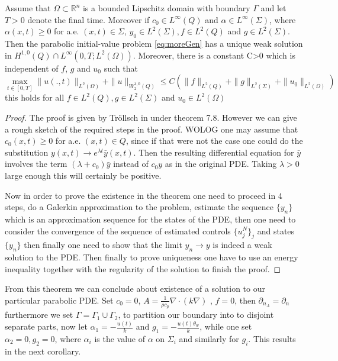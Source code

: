 \begin{theorem} Assume that $\Omega \subset \mathbb{R}^n$ is a bounded Lipschitz domain with boundary $\Gamma$ and let $T>0$ denote the final time. Moreover if $c_0 \in L^{\infty}(Q)$ and $\alpha \in L^{\infty}(\Sigma)$, where $\alpha(x,t) \geq 0$ for a.e. $(x,t) \in \Sigma$, $y_0 \in L^2(\Sigma), f \in L^2(Q)$ and $g \in L^2(\Sigma)$. Then the parabolic initial-value problem \eqref{eq:moreGen} has a unique weak solution in $H^{1,0}(Q)\cap L^{\infty}(0,T;L^2(\Omega))$. Moreover, there is a constant C>0 which is independent of $f$, $g$ and $u_0$ such that 
\begin{equation*}
    \max_{t \in [0,T]}\|u(.,t)\|_{L^2(\Omega)} + \|u\|_{W_2^{1,0}(Q)} \leq C(\|f\|_{L^2(Q)} + \|g\|_{L^2(\Sigma)} + \|u_0\|_{L^2(\Omega)})
\end{equation*}
this holds for all $f \in L^2(Q), g \in L^2(\Sigma)$ and $u_0 \in L^2(\Omega)$
\end{theorem}

\begin{proof}
The proof is given by Tröllsch in \cite{optimalControl} under theorem 7.8. However we can give a rough sketch of the required steps in the proof. WOLOG one may assume that $c_0(x,t)\geq 0$ for a.e. $(x,t) \in Q$, since if that were not the case one could do the substitution $y(x,t) \rightarrow e^{\lambda t}\bar{y}(x,t)$. Then the resulting differential equation for $\bar{y}$ involves the term $(\lambda + c_0)\bar{y}$ instead of $c_0y$ as in the original PDE. Taking $\lambda >0$ large enough this will certainly be positive. 

Now in order to prove the existence in the theorem one need to proceed in 4 steps, do a Galerkin approximation to the problem, estimate the sequence $\{y_n \}$ which is an approximation sequence for the states of the PDE, then one need to consider the convergence of the sequence of estimated controls $\{u_j^N\}_j$ and states $\{ y_n \}$ then finally one need to show that the limit $y_n \rightarrow y$ is indeed a weak solution to the PDE. Then finally to prove uniqueness one have to use an energy inequality together with the regularity of the solution to finish the proof.
\end{proof}


From this theorem we can conclude about existence of a solution to our particular parabolic PDE. Set $c_0 = 0$, $A = \frac{1}{\rho c_p}\nabla \cdot (k\nabla)$ , $f = 0$, then $\partial_{n_A} = \partial_n$ furthermore we set $\Gamma = \Gamma_1 \cup \Gamma_2$, to partition our boundary into to disjoint separate parts, now let $\alpha_1 = -\frac{u(t)}{k}$ and $g_1 = -\frac{u(t)\theta_w}{k}$, while one set $\alpha_2 = 0, g_2 = 0$, where $\alpha_i$ is the value of $\alpha$ on $\Sigma_i$ and similarly for $g_i$. This results in the next corollary. 

